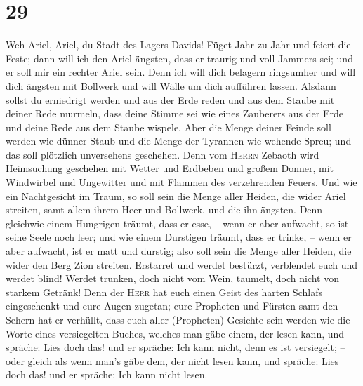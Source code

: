 \hypertarget{section-28}{%
\section{29}\label{section-28}}

 Weh Ariel, Ariel, du Stadt des Lagers Davids! Füget Jahr
zu Jahr und feiert die Feste;  dann will ich den Ariel
ängsten, dass er traurig und voll Jammers sei; und er soll mir ein
rechter Ariel sein.  Denn ich will dich belagern
ringsumher und will dich ängsten mit Bollwerk und will Wälle um dich
aufführen lassen.  Alsdann sollst du erniedrigt werden und
aus der Erde reden und aus dem Staube mit deiner Rede murmeln, dass
deine Stimme sei wie eines Zauberers aus der Erde und deine Rede aus dem
Staube wispele.  Aber die Menge deiner Feinde soll werden
wie dünner Staub und die Menge der Tyrannen wie wehende Spreu; und das
soll plötzlich unversehens geschehen.  Denn vom
\textsc{Herrn} Zebaoth wird Heimsuchung geschehen mit Wetter und
Erdbeben und großem Donner, mit Windwirbel und Ungewitter und mit
Flammen des verzehrenden Feuers.  Und wie ein Nachtgesicht
im Traum, so soll sein die Menge aller Heiden, die wider Ariel streiten,
samt allem ihrem Heer und Bollwerk, und die ihn ängsten. 
Denn gleichwie einem Hungrigen träumt, dass er esse, -- wenn er aber
aufwacht, so ist seine Seele noch leer; und wie einem Durstigen träumt,
dass er trinke, -- wenn er aber aufwacht, ist er matt und durstig; also
soll sein die Menge aller Heiden, die wider den Berg Zion streiten.
 Erstarret und werdet bestürzt, verblendet euch und werdet
blind! Werdet trunken, doch nicht vom Wein, taumelt, doch nicht von
starkem Getränk!  Denn der \textsc{Herr} hat euch einen
Geist des harten Schlafs eingeschenkt und eure Augen zugetan; eure
Propheten und Fürsten samt den Sehern hat er verhüllt, 
dass euch aller (Propheten) Gesichte sein werden wie die Worte eines
versiegelten Buches, welches man gäbe einem, der lesen kann, und
spräche: Lies doch das! und er spräche: Ich kann nicht, denn es ist
versiegelt; --  oder gleich als wenn man's gäbe dem, der
nicht lesen kann, und spräche: Lies doch das! und er spräche: Ich kann
nicht lesen.

